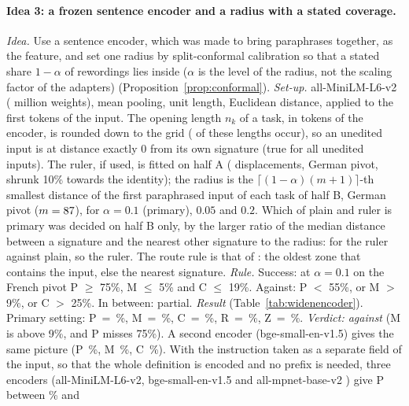 \paragraph{Idea 3: a frozen sentence encoder and a radius with a stated coverage.}
\emph{Idea.} Use a sentence encoder, which was made to bring paraphrases together, as the feature, and
set one radius by split-conformal calibration so that a stated share $1 - \alpha$ of rewordings lies
inside ($\alpha$ is the level of the radius, not the scaling factor of the adapters) (Proposition~\ref{prop:conformal}). \emph{Set-up.} all-MiniLM-L6-v2 (\WidenEncParams{} million
weights), mean pooling, unit length, Euclidean distance, applied to the first tokens of the input. The
opening length $n_k$ of a task, in tokens of the encoder, is rounded down to the grid \WidenEncGrid{} (\WidenEncPrefixes{} of these lengths occur), so an unedited input is at distance exactly 0 from its own signature
(true for all \WidenEncUneditedZero{} unedited inputs). The ruler, if used, is fitted on half A
(\WidenEncDisplacements{} displacements, German pivot, shrunk 10\% towards the identity); the radius is
the $\lceil (1-\alpha)(m+1) \rceil$-th smallest distance of the first paraphrased input of each task of half B, German pivot
($m = 87{}$), for $\alpha = 0.1$ (primary), $0.05$ and $0.2$. Which of plain and ruler is primary
was decided on half B only, by the larger ratio of the median distance between a signature and the
nearest other signature to the radius: \WidenEncRatioRuler{} for the ruler against \WidenEncRatioPlain{} plain,
so the ruler. The route rule is that of \cert{}: the oldest zone that contains the input, else the nearest signature.
\emph{Rule.} Success: at $\alpha = 0.1$ on the French pivot \textsf{P} $\ge$ 75\%, \textsf{M} $\le$ 5\% and \textsf{C} $\le$ 19\%.
Against: \textsf{P} $<$ 55\%, or \textsf{M} $>$ 9\%, or \textsf{C} $>$ 25\%. In between: partial.
\emph{Result} (Table~\ref{tab:widenencoder}). Primary setting: \textsf{P}~=~\WidenEncPrimP{}\%, \textsf{M}~=~\WidenEncPrimM{}\%,
\textsf{C}~=~\WidenEncPrimC{}\%, \textsf{R}~=~\WidenEncPrimR{}\%, \textsf{Z}~=~\WidenEncPrimZ{}\%. \emph{Verdict: against}
(\textsf{M} is above 9\%, and \textsf{P} misses 75\%). A second encoder (bge-small-en-v1.5) gives the same picture
(\textsf{P}~\WidenBgeP{}\%, \textsf{M}~\WidenBgeM{}\%, \textsf{C}~\WidenBgeC{}\%). With the instruction taken as a separate field of the input, so that the whole
definition is encoded and no prefix is needed, three encoders (all-MiniLM-L6-v2, bge-small-en-v1.5 \citep{xiao2023cpack} and all-mpnet-base-v2 \citep{song2020mpnet}) give \textsf{P} between \WidenFieldPLow{}\% and
